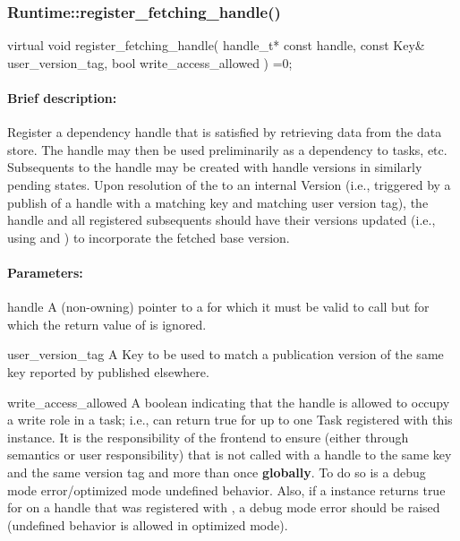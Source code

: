 \subsubsection{Runtime::register\_fetching\_handle()}
\begin{CppCode}
    virtual void
    register_fetching_handle(
      handle_t* const handle,
      const Key& user_version_tag,
      bool write_access_allowed
    ) =0;
\end{CppCode}

\paragraph{Brief description:} Register a dependency handle that is satisfied by retrieving data from the data store.
       The handle may then be used preliminarily as a dependency to tasks, etc.  Subsequents to the handle
       may be created with handle versions in similarly pending states.  Upon resolution of the 
       to an internal Version (i.e., triggered by a publish of a handle with a matching key and matching user
       version tag), the handle and all registered subsequents should have their versions updated (i.e., using
        and ) to incorporate the fetched base version.
     
\paragraph{Parameters:}
\begin{compactdesc} 
\item[handle] A (non-owning) pointer to a  for which it must be valid to call 
     but for which the return value of  is ignored.
     
\item[user\_version\_tag] A Key to be used to match a publication version of the same key reported
       by  published elsewhere.
     
\item[write\_access\_allowed] A boolean indicating that the handle is allowed to occupy a write role in
       a task; i.e.,  can return true for up to one Task  registered with this instance.
       It is the responsibility of the frontend to ensure (either through semantics or user responsibility) that
        is not called with a handle to the same key and the same version tag and
        more than once {\bf globally}.  To do so is a debug mode error/optimized mode
       undefined behavior.  Also, if a  instance returns true for 
       on a handle that was registered with , a debug mode error should be raised
       (undefined behavior is allowed in optimized mode).
\end{compactdesc}
     
